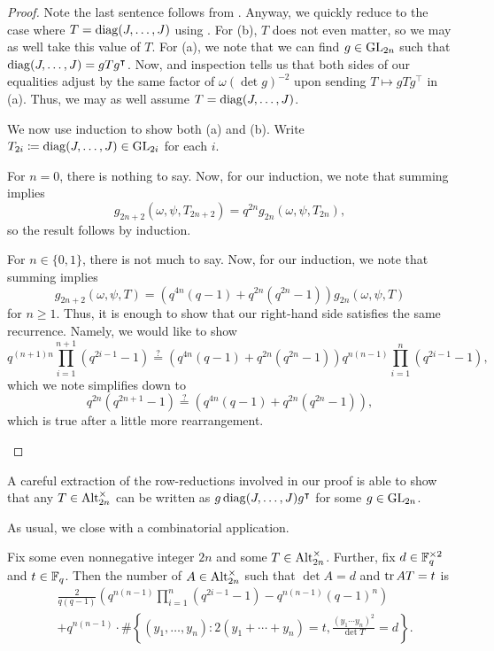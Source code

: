 \begin{proof}
    Note the last sentence follows from . Anyway, we quickly reduce to the case where $T=\operatorname{diag}(J,\ldots,J)$ using . For (b), $T$ does not even matter, so we may as well take this value of $T$. For (a), we note that we can find $g\in\mathrm{GL}_{2n}$ such that $\operatorname{diag}(J,\ldots,J)=gTg^\intercal$. Now,  and inspection tells us that both sides of our equalities adjust by the same factor of $\omega(\det g)^{-2}$ upon sending $T\mapsto gTg^\intercal$ in (a). Thus, we may as well assume $T=\operatorname{diag}(J,\ldots,J)$.

    We now use induction to show both (a) and (b). Write $T_{2i}\coloneqq\operatorname{diag}(J,\ldots,J)\in\mathrm{GL}_{2i}$ for each $i$.
    \begin{listalph}
        \item For $n=0$, there is nothing to say. Now, for our induction, we note that summing  implies
        \[g_{2n+2}(\omega,\psi,T_{2n+2})=q^{2n}g_{2n}(\omega,\psi,T_{2n}),\]
        so the result follows by induction.
        \item For $n\in\{0,1\}$, there is not much to say. Now, for our induction, we note that summing  implies
        \[g_{2n+2}(\omega,\psi,T)=\left(q^{4n}(q-1)+q^{2n}\left(q^{2n}-1\right)\right)g_{2n}(\omega,\psi,T)\]
        for $n\ge1$. Thus, it is enough to show that our right-hand side satisfies the same recurrence. Namely, we would like to show
        \[q^{\left(n+1\right)n}\prod_{i=1}^{n+1}\left(q^{2i-1}-1\right)\stackrel?=\left(q^{4n}\left(q-1\right)+q^{2n}\left(q^{2n}-1\right)\right)q^{n\left(n-1\right)}\prod_{i=1}^{n}\left(q^{2i-1}-1\right),\]
        which we note simplifies down to
        \[q^{2n}\left(q^{2n+1}-1\right)\stackrel?=\left(q^{4n}\left(q-1\right)+q^{2n}\left(q^{2n}-1\right)\right),\]
        which is true after a little more rearrangement.
        \qedhere
    \end{listalph}
\end{proof}
\begin{remark}
    A careful extraction of the row-reductions involved in our proof is able to show that any $T\in\operatorname{Alt}_{2n}^\times$ can be written as $g\operatorname{diag}(J,\ldots,J)g^\intercal$ for some $g\in\mathrm{GL}_{2n}$.
\end{remark}
As usual, we close with a combinatorial application.
\begin{corollary} \label{cor:count-alt}
    Fix some even nonnegative integer $2n$ and some $T\in\operatorname{Alt}_{2n}^\times$. Further, fix $d\in\mathbb F_q^{\times2}$ and $t\in\mathbb F_q$. Then the number of $A\in\operatorname{Alt}_{2n}^\times$ such that $\det A=d$ and $\operatorname{tr} AT=t$ is
    \begin{align*}
        &\frac2{q(q-1)}\left(q^{n(n-1)}\prod_{i=1}^{n}\left(q^{2i-1}-1\right)-q^{n(n-1)}(q-1)^n\right) \\
        &+ q^{n(n-1)}\cdot\#\left\{(y_1,\ldots,y_n):2(y_1+\cdots+y_n)=t,\frac{(y_1\cdots y_n)^2}{\det T}=d\right\}.
    \end{align*}
\end{corollary}
